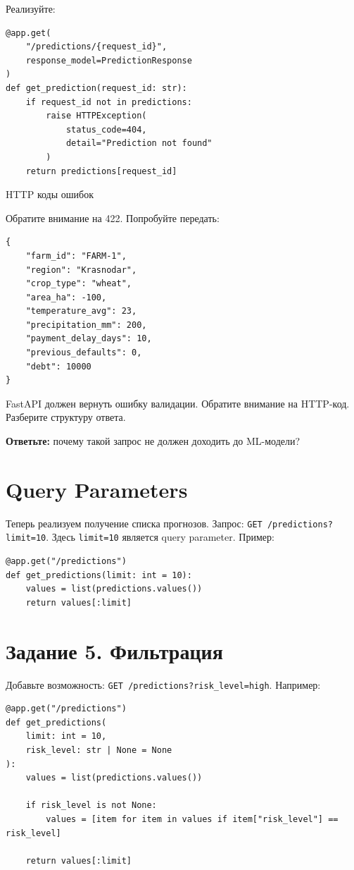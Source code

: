\documentclass[12pt,a4paper]{article}
\begin{document}
Реализуйте:

\begin{lstlisting}[caption={Endpoint /predictions/\{request\_id\}}]
@app.get(
    "/predictions/{request_id}",
    response_model=PredictionResponse
)
def get_prediction(request_id: str):
    if request_id not in predictions:
        raise HTTPException(
            status_code=404,
            detail="Prediction not found"
        )
    return predictions[request_id]
\end{lstlisting}

{HTTP коды ошибок}

Обратите внимание на 422. Попробуйте передать:

\begin{lstlisting}[caption={Некорректные данные}]
{
    "farm_id": "FARM-1",
    "region": "Krasnodar",
    "crop_type": "wheat",
    "area_ha": -100,
    "temperature_avg": 23,
    "precipitation_mm": 200,
    "payment_delay_days": 10,
    "previous_defaults": 0,
    "debt": 10000
}
\end{lstlisting}

FastAPI должен вернуть ошибку валидации. Обратите внимание на HTTP-код. Разберите структуру ответа.

\textbf{Ответьте:} почему такой запрос не должен доходить до ML-модели?

\section{Query Parameters}

Теперь реализуем получение списка прогнозов. Запрос: \texttt{GET /predictions?limit=10}. Здесь \texttt{limit=10} является query parameter. Пример:

\begin{lstlisting}[caption={Endpoint /predictions}]
@app.get("/predictions")
def get_predictions(limit: int = 10):
    values = list(predictions.values())
    return values[:limit]
\end{lstlisting}

\section{Задание 5. Фильтрация}

Добавьте возможность: \texttt{GET /predictions?risk\_level=high}. Например:

\begin{lstlisting}[caption={/predictions с фильтрацией}]
@app.get("/predictions")
def get_predictions(
    limit: int = 10,
    risk_level: str | None = None
):
    values = list(predictions.values())

    if risk_level is not None:
        values = [item for item in values if item["risk_level"] == risk_level]

    return values[:limit]
\end{lstlisting}
\end{document}
